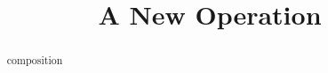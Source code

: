 \documentclass{ximera}
\title{A New Operation}
\begin{document}
\begin{abstract}
composition
\end{abstract}
\maketitle
\end{document}
